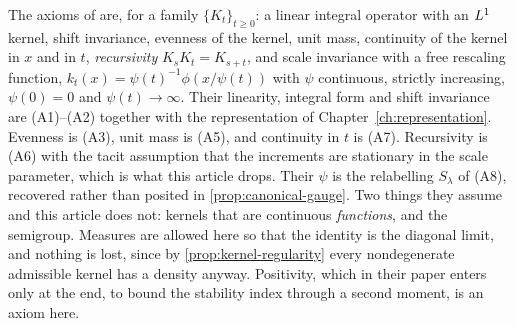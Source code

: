 \begin{remark}\label{rem:provenance-pauwels}
The axioms of  are, for a family $\{K_t\}_{t \ge 0}$: a linear
integral operator with an $L^1$ kernel, shift invariance, evenness of the kernel, unit mass,
continuity of the kernel in $x$ and in $t$, \emph{recursivity} $K_sK_t = K_{s+t}$, and scale
invariance with a free rescaling function, $k_t(x) = \psi(t)^{-1}\phi(x/\psi(t))$ with $\psi$
continuous, strictly increasing, $\psi(0) = 0$ and $\psi(t) \to \infty$. Their linearity,
integral form and shift invariance are (A1)--(A2) together with the representation of
Chapter~\ref{ch:representation}. Evenness is (A3), unit mass is (A5), and continuity in $t$ is
(A7). Recursivity is (A6) with the tacit assumption that the increments are stationary in the
scale parameter, which is what this article drops. Their $\psi$ is the relabelling $S_\lambda$
of (A8), recovered rather than posited in \ref{prop:canonical-gauge}. Two things they assume
and this article does not: kernels that are continuous \emph{functions}, and the semigroup.
Measures are allowed here so that the identity is the diagonal limit, and nothing is lost,
since by \ref{prop:kernel-regularity} every nondegenerate admissible kernel has a density
anyway. Positivity, which in their paper enters only at the end, to bound the stability index
through a second moment, is an axiom here.
\end{remark}

